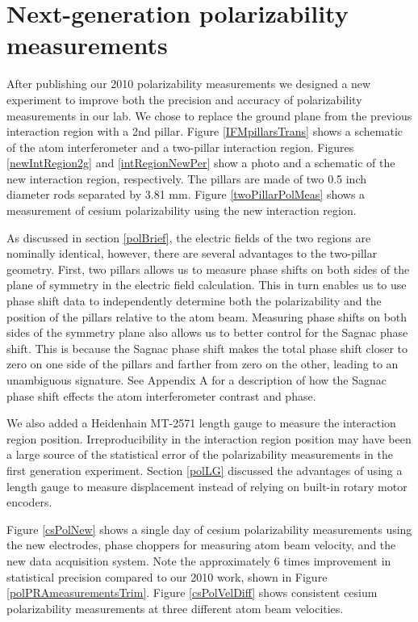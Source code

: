 \section{Next-generation polarizability measurements}
\label{polChapterGradElg}

After publishing our 2010 polarizability measurements we designed a new experiment to improve both the precision and accuracy of polarizability measurements in our lab. We chose to replace the ground plane from the previous interaction region with a 2nd pillar. Figure \ref{IFMpillarsTrans} shows a schematic of the atom interferometer and a two-pillar interaction region. Figures \ref{newIntRegion2g} and \ref{intRegionNewPer} show a photo and a schematic of the new interaction region, respectively. The pillars are made of two 0.5 inch diameter rods separated by 3.81 mm. Figure \ref{twoPillarPolMeas} shows a measurement of cesium polarizability using the new interaction region.


As discussed in section \ref{polBrief}, the electric fields of the two regions are nominally identical, however, there are several advantages to the two-pillar geometry. First, two pillars allows us to measure phase shifts on both sides of the plane of symmetry in the electric field calculation. This in turn enables us to use phase shift data to independently determine both the polarizability and the position of the pillars relative to the atom beam. Measuring phase shifts on both sides of the symmetry plane also allows us to better control for the Sagnac phase shift. This is because the Sagnac phase shift makes the total phase shift closer to zero on one side of the pillars and farther from zero on the other, leading to an unambiguous signature. See Appendix A for a description of how the Sagnac phase shift effects the atom interferometer contrast and phase.


We also added a Heidenhain MT-2571 length gauge to measure the interaction region position. Irreproducibility in the interaction region position may have been a large source of the statistical error of the polarizability measurements in the first generation experiment. Section \ref{polLG} discussed the advantages of using a length gauge to measure displacement instead of relying on built-in rotary motor encoders.


Figure \ref{csPolNew} shows a single day of cesium polarizability measurements using the new electrodes, phase choppers for measuring atom beam velocity, and the new data acquisition system. Note the approximately 6 times improvement in statistical precision compared to our 2010 work, shown in Figure \ref{polPRAmeasurementsTrim}. Figure \ref{csPolVelDiff} shows consistent cesium polarizability measurements at three different atom beam velocities.



